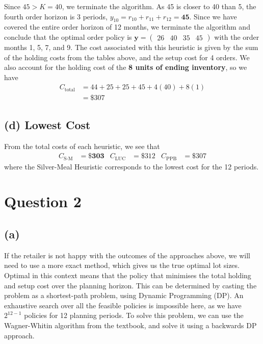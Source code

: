 \documentclass[12pt]{article}
\begin{document}
\noindent Since $45 > K = 40$, we terminate the algorithm. As 45 is closer to 40 than 5, the fourth order horizon is 3 periods, $y_{10} = r_{10} + r_{11} + r_{12} = \mathbf{45}$. Since we have covered the entire order horizon of 12 months, we terminate the algorithm and conclude that the optimal order policy is $\mathbf{y} = \begin{pmatrix}
    26 & 40 & 35 & 45
\end{pmatrix}$ with the order months 1, 5, 7, and 9. The cost associated with this heuristic is given by the sum of the holding costs from the tables above, and the setup cost for 4 orders. We also account for the holding cost of the \textbf{8 units of ending inventory}, so we have \begin{align*}
    C_{\text{total}} &= 44 + 25 + 25 + 45 + 4(40) + 8(1) \\ 
    &= \boxed{\$307}
\end{align*}

\subsection*{(d) Lowest Cost}

From the total costs of each heuristic, we see that \begin{align*}
    C_{\text{S-M}} &= \mathbf{\$303} & C_{\text{LUC}} &= \$312 & C_{\text{PPB}} &= \$307 
\end{align*} where the Silver-Meal Heuristic corresponds to the lowest cost for the 12 periods. 

\newpage 

\section*{Question 2}

\subsection*{(a)}

If the retailer is not happy with the outcomes of the approaches above, we will need to use a more exact method, which gives us the true optimal lot sizes. Optimal in this context means that the policy that minimises the total holding and setup cost over the planning horizon. This can be determined by casting the problem as a shortest-path problem, using Dynamic Programming (DP). An exhaustive search over all the feasible policies is impossible here, as we have $2^{12-1}$ policies for 12 planning periods. To solve this problem, we can use the Wagner-Whitin algorithm from the textbook, and solve it using a backwards DP approach. \\
\end{document}
